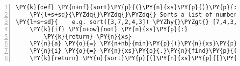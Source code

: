 \begin{Verbatim}[commandchars=\\\{\},numbers=left,firstnumber=1,stepnumber=1,codes={\catcode`\$=3\catcode`\^=7\catcode`\_=8}]
\PY{k}{def} \PY{n+nf}{sort}\PY{p}{(}\PY{n}{xs}\PY{p}{)}\PY{p}{:}
    \PY{l+s+sd}{\PYZdq{}\PYZdq{}\PYZdq{} Sorts a list of numbers.}
\PY{l+s+sd}{    e.g. sort([3,7,2,4,3]) \PYZhy{}\PYZgt{} [7,4,3,3,2] \PYZdq{}\PYZdq{}\PYZdq{}}
    \PY{k}{if} \PY{o+ow}{not} \PY{n}{xs}\PY{p}{:}
        \PY{k}{return} \PY{n}{xs}
    \PY{n}{a} \PY{o}{=} \PY{n+nb}{min}\PY{p}{(}\PY{n}{xs}\PY{p}{)}
    \PY{n}{i} \PY{o}{=} \PY{n}{xs}\PY{o}{.}\PY{n}{find}\PY{p}{(}\PY{n}{a}\PY{p}{)}
    \PY{k}{return} \PY{n}{sort}\PY{p}{(}\PY{n}{xs}\PY{p}{[}\PY{p}{:}\PY{n}{i}\PY{p}{]} \PY{o}{+} \PY{n}{xs}\PY{p}{[}\PY{n}{i}\PY{o}{+}\PY{l+m+mi}{1}\PY{p}{:}\PY{p}{]}\PY{p}{)} \PY{o}{+} \PY{p}{[}\PY{n}{a}\PY{p}{]}
\end{Verbatim}
